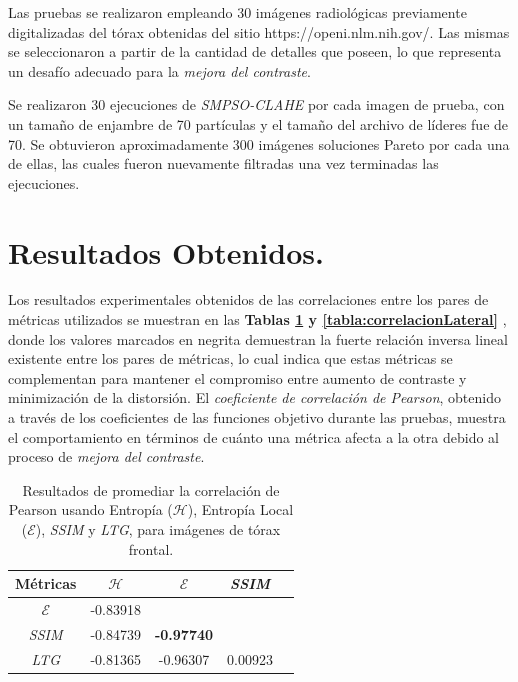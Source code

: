 Las pruebas se realizaron empleando 30 imágenes radiológicas previamente digitalizadas del tórax obtenidas del sitio https://openi.nlm.nih.gov/. Las mismas se seleccionaron a partir de la cantidad de detalles que poseen, lo que representa un desafío adecuado para la {\it mejora del contraste}.

Se realizaron 30 ejecuciones de \textit{SMPSO-CLAHE} por cada imagen de prueba, con un tamaño de enjambre de 70 partículas y el tamaño del archivo de líderes fue de 70. Se obtuvieron aproximadamente 300 imágenes soluciones Pareto por cada una de ellas, las cuales fueron nuevamente filtradas una vez terminadas las ejecuciones.


\section{Resultados Obtenidos.}

Los resultados experimentales obtenidos de las correlaciones entre los pares de métricas utilizados se muestran en las \textbf{Tablas \ref{tabla:correlacionFrontal} y \ref{tabla:correlacionLateral}} , donde los valores marcados en negrita demuestran la fuerte relación inversa lineal existente entre los pares de métricas, lo cual indica que estas métricas se complementan para mantener el compromiso entre aumento de contraste y minimización de la distorsión. El {\it coeficiente de correlación de Pearson}, obtenido a través de los coeficientes de las funciones objetivo durante las pruebas, muestra el comportamiento en términos de cuánto una métrica afecta a la otra debido al proceso de {\it mejora del contraste}.

\begin{table}[H]
\begin{center}
\caption{Resultados de promediar la correlación de Pearson usando Entropía ($\mathscr{H}$), Entropía Local ($\mathscr E$), \textit{SSIM} y \textit{LTG}, para imágenes de tórax frontal.}
 \begin{tabular}{|c|c|c|c|c|}
            \hline
            Métricas & $\mathscr{H}$ & $\mathscr{E}$ & \textit{SSIM}\\
            \hline
            $\mathscr{E}$ & -0.83918  &  &  \\ \hline
            \textit{SSIM} & -0.84739 & \textbf{-0.97740} & \\ \hline
            \textit{LTG} & -0.81365 & -0.96307 &  0.00923   \\ \hline
            \end{tabular}
\label{tabla:correlacionFrontal}
\end{center}
\end{table}

